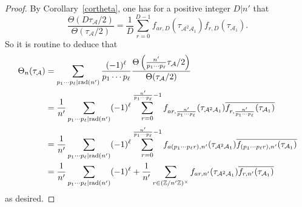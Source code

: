 \documentclass[11pt, reqno]{amsart}
\theoremstyle{plain}
\newtheorem{lemma}[theorem]{Lemma}
\theoremstyle{definition}
\numberwithin{equation}{section}
\begin{document}
\begin{proof}
By Corollary~\ref{cortheta},  one has for a positive integer $D|n'$ that
$$
\frac{\Theta(D\tau_{\mathcal{A}}/2)}{\Theta(\tau_{\mathcal{A}}/2)}=\frac{1}{D}\sum_{r=0}^{D-1}f_{ar,D}(\tau_{\mathcal{A}^{2}\mathcal{A}_{1}})f_{r,D}(\tau_{\mathcal{A}_{1}}).
$$
So it is routine to deduce that
     \begin{align*}
       \Theta_{n}(\tau_{\mathcal{A}})&= \sum_{p_{1}\cdots p_{\ell}|{\rm rad}(n')}\frac{(-1)^{\ell}}{p_{1}\cdots p_{\ell}}\frac{\Theta\left(\frac{n'}{p_{1}\cdots p_{\ell}}\tau_{\mathcal{A}}/2\right)}{\Theta(\tau_{\mathcal{A}}/2)}\\
       &= \frac{1}{n'}\sum_{p_{1}\cdots p_{\ell}|{\rm rad}(n')}(-1)^{\ell}\sum_{r=0}^{\frac{n'}{p_{1}\cdots p_{\ell}}-1}f_{ar,\frac{n'}{p_{1}\cdots p_{\ell}}}(\tau_{\mathcal{A}^{2}\mathcal{A}_{1}})\overline{f_{r,\frac{n'}{p_{1}\cdots p_{\ell}}}(\tau_{\mathcal{A}_{1}})}\\
       &=\frac{1}{n'}\sum_{p_{1}\cdots p_{\ell}|{\rm rad}(n')}(-1)^{\ell}\sum_{r=0}^{\frac{n'}{p_{1}\cdots p_{\ell}}-1}f_{a(p_{1}\cdots p_{\ell}r),n'}(\tau_{\mathcal{A}^{2}\mathcal{A}_{1}})\overline{f_{(p_{1}\cdots p_{\ell}r),n'}(\tau_{\mathcal{A}_{1}})}\\
       &=\frac{1}{n'}\sum_{p_{1}\cdots p_{\ell}|{\rm rad}(n')}(-1)^{\ell}+\frac{1}{n'}\sum_{r\in(\mathbb{Z}/n'\mathbb{Z})^{\times}}f_{ar,n'}(\tau_{\mathcal{A}^{2}\mathcal{A}_{1}})\overline{f_{r,n'}(\tau_{\mathcal{A}_{1}})}
    \end{align*}
    as desired.
\end{proof}


   
\end{document}
